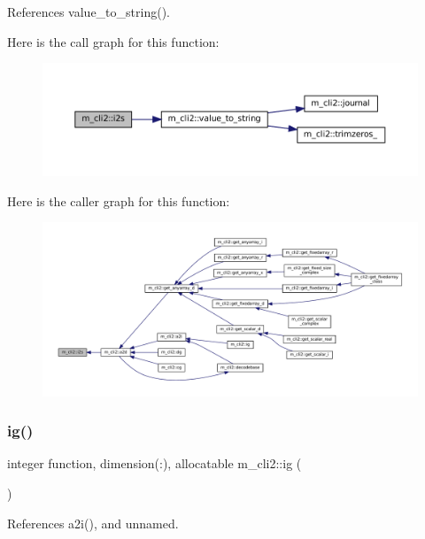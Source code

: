 References value\+\_\+to\+\_\+string().

Here is the call graph for this function\+:\nopagebreak
\begin{figure}[H]
\begin{center}
\leavevmode
\includegraphics[width=350pt]{namespacem__cli2_aa106d3533fd6d4845f0b3e94b2a79ffb_cgraph}
\end{center}
\end{figure}
Here is the caller graph for this function\+:\nopagebreak
\begin{figure}[H]
\begin{center}
\leavevmode
\includegraphics[width=350pt]{namespacem__cli2_aa106d3533fd6d4845f0b3e94b2a79ffb_icgraph}
\end{center}
\end{figure}
\mbox{\label{namespacem__cli2_a11c3cc864e613c90b2a02c7409c00828}} 
\subsubsection{\texorpdfstring{ig()}{ig()}}
{\footnotesize\ttfamily integer function, dimension(\+:), allocatable m\+\_\+cli2\+::ig (\begin{DoxyParamCaption}{ }\end{DoxyParamCaption})\hspace{0.3cm}{\ttfamily [private]}}



References a2i(), and unnamed.

